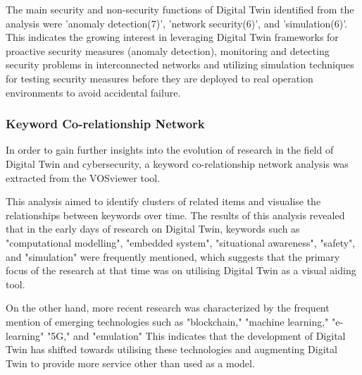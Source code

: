 The main security and non-security functions of Digital Twin identified from the analysis were 'anomaly detection(7)', 'network security(6)', and 'simulation(6)'. This indicates the growing interest in leveraging Digital Twin frameworks for proactive security measures (anomaly detection), monitoring and detecting security problems in interconnected networks and utilizing simulation techniques for testing security measures before they are deployed to real operation environments to avoid accidental failure. 

\subsubsection*{Keyword Co-relationship Network}
In order to gain further insights into the evolution of research in the field of Digital Twin and cybersecurity, a keyword co-relationship network analysis was extracted from the VOSviewer tool. 

This analysis aimed to identify clusters of related items and visualise the relationships between keywords over time. The results of this analysis revealed that in the early days of research on Digital Twin, keywords such as "computational modelling", "embedded system", "situational awareness", "safety", and "simulation" were frequently mentioned, which suggests that the primary focus of the research at that time was on utilising Digital Twin as a visual aiding tool. 

On the other hand, more recent research was characterized by the frequent mention of emerging technologies such as "blockchain," "machine learning," "e-learning" "5G," and "emulation" This indicates that the development of Digital Twin has shifted towards utilising these technologies and augmenting Digital Twin to provide more service other than used as a model.



